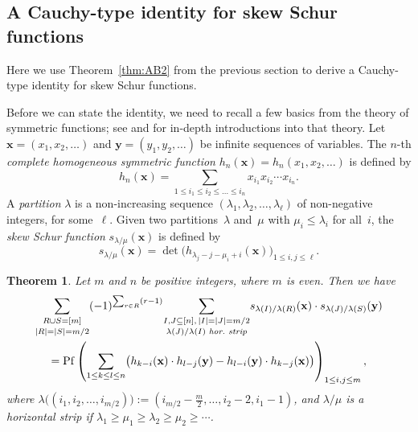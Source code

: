 \documentclass[12pt,reqno]{amsart}
\numberwithin{equation}{section}
\newtheorem{theorem}{Theorem}
\theoremstyle{definition}
\theoremstyle{remark}
\def\Pf{\operatorname{Pf}}
\def\la{\lambda}
\begin{document}
\subsection{A Cauchy-type identity for skew Schur functions}
\label{sec:Cauchy}

Here we use Theorem~\ref{thm:AB2} from the previous section to derive 
a Cauchy-type identity for skew Schur functions. 

Before we can state
the identity, we need to recall a few basics from the theory of
symmetric functions; see \cite{MacdAC} and \cite[ch.~7]{StanBI}
for in-depth introductions into that theory.
Let $\mathbf x=(x_1,x_2,\dots)$ and $\mathbf y=(y_1,y_2,\dots)$
be infinite sequences of variables.
The $n$-th {\it complete homogeneous symmetric function}
$h_n(\mathbf x)=h_n(x_1,x_2,\dots)$ is defined by
$$
h_n(\mathbf x)=\sum_{1\le i_1\le i_2\le\dots\le i_n}
x_{i_1}x_{i_2}\cdots x_{i_n}.
$$
A {\it partition} $\la$ is
a non-increasing sequence $(\la_1,\la_2,\dots,\la_\ell)$ of
non-negative integers, for some~$\ell$. 
Given two partitions~$\la$ and~$\mu$ with
$\mu_i\le\la_i$ for all~$i$, 
the {\it skew Schur function} $s_{\la/\mu}(\mathbf x)$
is defined by
\begin{equation} \label{eq:Schur} 
s_{\la/\mu}(\mathbf x)=\det\bigl(h_{\la_j-j-\mu_i+i}(\mathbf 
x)\bigr)_{1\le i,j\le \ell}.
\end{equation}

\begin{theorem} \label{thm:Cauchy}
Let $m$ and $n$ be positive integers, where $m$ is even.
Then we have
\begin{multline} \label{eq:Cauchy}
\underset{|R|=|S|=m/2}{\sum_{R\cup S=[m]}}
(-1)^{\sum_{r\in R}(r-1)}
\underset{\la(J)/\la(I)\text{ \em hor.\ strip}}
{\sum_{I,J\subseteq[n],\,|I|=|J|=m/2}}
s_{\la(I)/\la(R)}(\mathbf x)\cdot s_{\la(J)/\la(S)}(\mathbf y)\\
=\Pf\left(\sum_{1\le k\le l\le n}\bigl(
h_{k-i}(\mathbf x)\cdot h_{l-j}(\mathbf y)
-h_{l-i}(\mathbf y)\cdot h_{k-j}(\mathbf x)
\bigr)\right)_{1\le i,j\le m},
\end{multline}
where $\la\bigl((i_1,i_2,\dots,i_{m/2})\bigr)
:=(i_{m/2}-\frac {m} {2},\dots,i_2-2,i_1-1)$, and
$\la/\mu$ is a horizontal strip if $\la_1\ge\mu_1\ge\la_2\ge\mu_2
\ge\cdots$.
\end{theorem} 
\end{document}
